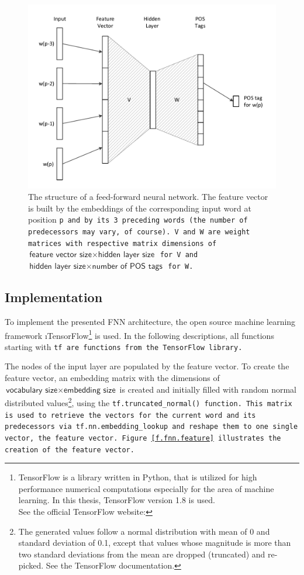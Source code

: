 \begin{figure}[ht]
	\includegraphics[width=\textwidth]{images/fnn_structure}
	\caption[Structure of a Feed-forward Neural Network]{The structure of a feed-forward neural network. The feature vector is built by the embeddings of the corresponding input word at position \tt{p} and by its \tt{3} preceding words (the number of predecessors may vary, of course). \tt{V} and \tt{W} are weight matrices with respective matrix dimensions of $\textsf{feature vector size} \times \textsf{hidden layer size}$ for \tt{V} and $\textsf{hidden layer size} \times \textsf{number of POS tags}$ for \tt{W}.}
	\label{f.fnn.structure}
\end{figure}

\subsection{Implementation}\label{c.postagging.fnn.implementation}
To implement the presented FNN architecture, the open source machine learning framework \i{TensorFlow}\footnote{TensorFlow is a library written in Python, that is utilized for high performance numerical computations especially for the area of machine learning. In this thesis, TensorFlow version 1.8 is used.\\See the official TensorFlow website: } is used. In the following descriptions, all functions starting with \tt{tf} are functions from the TensorFlow library.

The nodes of the input layer are populated by the feature vector. To create the feature vector, an embedding matrix with the dimensions of $\textsf{vocabulary size} \times \textsf{embedding size}$ is created and initially filled with random normal distributed values\footnote{The generated values follow a normal distribution with mean of 0 and standard deviation of 0.1, except that values whose magnitude is more than two standard deviations from the mean are dropped (truncated) and re-picked. See the TensorFlow documentation.}, using the \tt{tf.truncated\_normal()} function. This matrix is used to retrieve the vectors for the current word and its predecessors via \tt{tf.nn.embedding\_lookup} and reshape them to one single vector, the feature vector. Figure \ref{f.fnn.feature} illustrates the creation of the feature vector.

